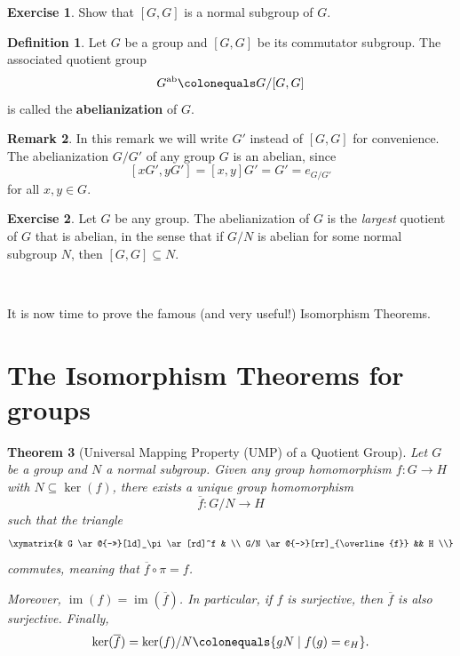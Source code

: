 \documentclass[12pt]{report}
\newtheorem{theorem}{Theorem}[chapter]
\numberwithin{equation}{section}
\numberwithin{theorem}{chapter}
\theoremstyle{definition}
\newtheorem{definition}[theorem]{Definition}
\newtheorem{exercise}{Exercise}
\newtheorem*{basic properties}{Basic Properties}
\newtheorem*{Important Remark}{Important Remark}
\newtheorem{remark}[theorem]{Remark}
\newcommand{\df}[1]{{\bf #1}\index{#1}}
\renewcommand{\ker}{\operatorname{ker}}
\DeclareMathOperator{\im}{im}
\begin{document}
\begin{exercise}
	Show that $[G,G]$ is a normal subgroup of $G$. 
\end{exercise}
  
  
\begin{definition}\label{abelianization of a group}
Let $G$ be a group and $[G,G]$ be its commutator subgroup. The associated quotient group 
$$G^{\textrm{ab}} \colonequals G/[G,G]$$ 
is called the \df{abelianization} of $G$.
\end{definition}  


\begin{remark}
In this remark we will write $G'$ instead of $[G,G]$ for convenience.
The abelianization $G/G'$ of any group $G$ is an abelian, since 
$$[xG', yG'] = [x,y]G' = G' = e_{G/G'}$$ 
for all $x,y \in G$.
\end{remark}

\begin{exercise}
	Let $G$ be any group. The abelianization of $G$ is the \emph{largest} quotient of $G$ that is abelian, in the sense that if $G/N$ is abelian for some normal subgroup $N$, then $[G,G] \subseteq N$.
\end{exercise}


\


It is now time to prove the famous (and very useful!) Isomorphism Theorems.


\section{The Isomorphism Theorems for groups}



\begin{theorem}[Universal Mapping Property (UMP) of a Quotient Group]\label{UMP quotient group}
Let $G$ be a group and $N$ a normal subgroup. Given any group homomorphism $f\!: G \to H$ with $N \subseteq \ker(f)$, there exists a unique group homomorphism 
$$\overline{f}: G/N \to H$$ 
such that the triangle
$$\xymatrix{& G \ar@{->>}[ld]_\pi \ar[rd]^f  & \\
G/N \ar@{-->}[rr]_{\overline{f}}  && H \\}$$
commutes, meaning that $\overline{f} \circ \pi = f$.

\vspace{0.5em}

Moreover, $\im(f) = \im(\overline{f})$. In particular, if $f$ is surjective, then $\overline{f}$ is also surjective. Finally,
$$\ker(\overline{f}) = \ker(f)/N \colonequals \{ g N \mid f(g) = e_H\}.$$
\end{theorem}
\end{document}
